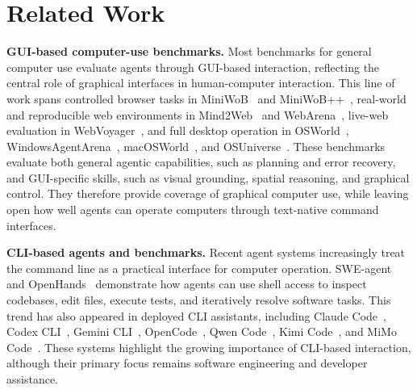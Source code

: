 
\section{Related Work}
\label{sec:related-work}

\noindent\textbf{GUI-based computer-use benchmarks.}
Most benchmarks for general computer use evaluate agents through GUI-based interaction, reflecting the central role of graphical interfaces in human-computer interaction. This line of work spans controlled browser tasks in MiniWoB~\citep{shi2017world} and MiniWoB++~\citep{zheran2018reinforcement}, real-world and reproducible web environments in Mind2Web~\citep{deng2023mind2web} and WebArena~\citep{zhou2024webarena}, live-web evaluation in WebVoyager~\citep{he2024webvoyager}, and full desktop operation in OSWorld~\citep{xie2024osworld}, WindowsAgentArena~\citep{bonatti2025windows}, macOSWorld~\citep{yang2026macosworld}, and OSUniverse~\citep{davydova2025osuniverse}. These benchmarks evaluate both general agentic capabilities, such as planning and error recovery, and GUI-specific skills, such as visual grounding, spatial reasoning, and graphical control. They therefore provide coverage of graphical computer use, while leaving open how well agents can operate computers through text-native command interfaces.

\noindent\textbf{CLI-based agents and benchmarks.}
Recent agent systems increasingly treat the command line as a practical interface for computer operation. SWE-agent~\citep{yang2024swe} and OpenHands~\citep{wang2025openhands} demonstrate how agents can use shell access to inspect codebases, edit files, execute tests, and iteratively resolve software tasks. This trend has also appeared in deployed CLI assistants, including Claude Code~\citep{anthropic2026claudecode}, Codex CLI~\citep{openai2025codex}, Gemini CLI~\citep{google2025geminicli}, OpenCode~\citep{opencode2026github}, Qwen Code~\citep{qwen_code2026}, Kimi Code~\citep{kimi_code2026}, and MiMo Code~\citep{mimo_code2026}. These systems highlight the growing importance of CLI-based interaction, although their primary focus remains software engineering and developer assistance.

